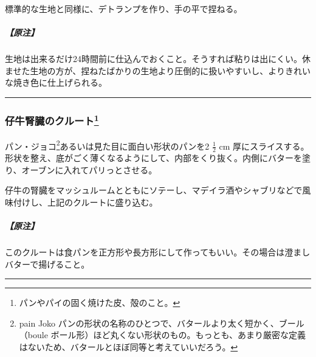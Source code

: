 \begin{Main}
標準的な生地と同様に、デトランプを作り、手の平で捏ねる。

\hypertarget{ux539fux6ce8-1}{%
\subparagraph{【原注】}\label{ux539fux6ce8-1}}

生地は出来るだけ24時間前に仕込んでおくこと。そうすれば粘りは出にくい。休ませた生地の方が、捏ねたばかりの生地より圧倒的に扱いやすいし、よりきれいな焼き色に仕上げられる。

\begin{center}\rule{0.5\linewidth}{\linethickness}\end{center}

\hypertarget{croute-aux-rognons}{%
\subsubsection[仔牛腎臓のクルート]{\texorpdfstring{仔牛腎臓のクルート\footnote{パンやパイの固く焼けた皮、殻のこと。}}{仔牛腎臓のクルート}}\label{croute-aux-rognons}}



パン・ジョコ\footnote{pain Joko
  パンの形状の名称のひとつで、バタールより太く短かく、ブール（boule
  ボール形）ほど丸くない形状のもの。もっとも、あまり厳密な定義はないため、バタールとほぼ同等と考えていいだろう。}あるいは見た目に面白い形状のパンを2
\(\frac{1}{2}\) cm
厚にスライスする。形状を整え、底がごく薄くなるようにして、内部をくり抜く。内側にバターを塗り、オーブンに入れてパリっとさせる。

仔牛の腎臓をマッシュルームとともにソテーし、マデイラ酒やシャブリなどで風味付けし、上記のクルートに盛り込む。

\hypertarget{ux539fux6ce8-2}{%
\subparagraph{【原注】}\label{ux539fux6ce8-2}}

このクルートは食パンを正方形や長方形にして作ってもいい。その場合は澄ましバターで揚げること。

\begin{center}\rule{0.5\linewidth}{\linethickness}\end{center}

\hypertarget{peches-imperatrice}{%
}
\end{Main}
